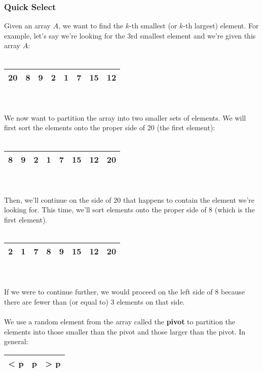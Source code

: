 \documentclass[]{article}
\theoremstyle{definition}
\begin{document}
			\subsubsection{Quick Select}
				Given an array $A$, we want to find the $k$-th smallest (or $k$-th largest) element. For example, let's say we're looking for the 3rd smallest element and we're given this array $A$: \\ \\
				\begin{tabular}{|c|c|c|c|c|c|c|c|}
					\hline 20 & 8 & 9 & 2 & 1 & 7 & 15 & 12 \\ \hline
				\end{tabular}
				\\ \\
				We now want to partition the array into two smaller sets of elements. We will first sort the elements onto the proper side of 20 (the first element):
				\\ \\
				\begin{tabular}{|c|c|c|c|c|c|c|c|}
					\hline 8 & 9 & 2 & 1 & 7 & 15 & 12 & 20 \\ \hline
				\end{tabular}
				\\ \\
				Then, we'll continue on the side of 20 that happens to contain the element we're looking for. This time, we'll sort elements onto the proper side of 8 (which is the first element).
				\\ \\
				\begin{tabular}{|c|c|c|c|c|c|c|c|}
					\hline 2 & 1 & 7 & 8 & 9 & 15 & 12 & 20 \\ \hline
				\end{tabular}
				\\ \\
				If we were to continue further, we would proceed on the left side of 8 because there are fewer than (or equal to) 3 elements on that side.
				\\ \\
				We use a random element from the array called the \textbf{pivot} to partition the elements into those smaller than the pivot and those larger than the pivot. In general: 
				\begin{tabular}{|c|c|c|}
					\hline < p & p & > p \\ \hline
				\end{tabular}
				\\ \\
\end{document}
